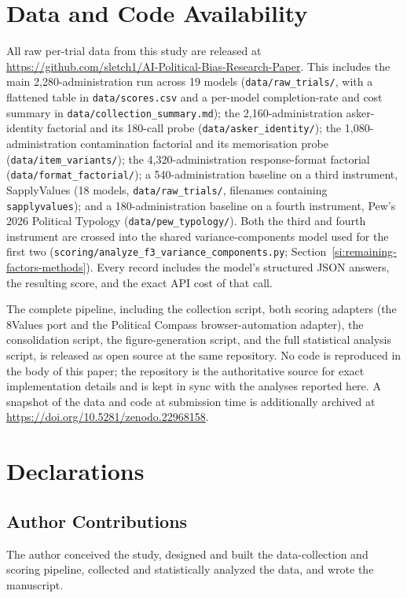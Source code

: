 \documentclass[11pt]{article}
\begin{document}
\section{Data and Code Availability}
\label{si:availability}

All raw per-trial data from this study are released at
\url{https://github.com/sletch1/AI-Political-Bias-Research-Paper}. This
includes the main 2{,}280-administration
run across 19 models (\texttt{data/raw\_trials/}, with a flattened table in
\texttt{data/scores.csv} and a per-model completion-rate and cost summary in
\texttt{data/collection\_summary.md}); the 2{,}160-administration
asker-identity factorial and its 180-call probe (\texttt{data/asker\_identity/});
the 1{,}080-administration contamination factorial and its memorisation
probe (\texttt{data/item\_variants/}); the 4{,}320-administration
response-format factorial (\texttt{data/format\_factorial/}); a
540-administration baseline on a third instrument, SapplyValues (18
models, \texttt{data/raw\_trials/}, filenames containing
\texttt{sapplyvalues}); and a 180-administration baseline on a fourth
instrument, Pew's 2026 Political Typology (\texttt{data/pew\_typology/}).
Both the third and fourth instrument are crossed into the shared
variance-components model used for the first two
(\texttt{scoring/analyze\_f3\_variance\_components.py}; Section~\ref{si:remaining-factors-methods}).
Every record includes the model's structured JSON answers, the resulting
score, and the exact API cost of that call.

The complete pipeline, including the collection script, both scoring
adapters (the 8Values port and the Political Compass browser-automation
adapter), the consolidation script, the figure-generation script, and the
full statistical analysis script, is released as open source at the same
repository. No code is reproduced in the body of this paper; the repository
is the authoritative source for exact implementation details and is kept
in sync with the analyses reported here. A snapshot of the data and code at
submission time is additionally archived at
\url{https://doi.org/10.5281/zenodo.22968158}.

\section{Declarations}
\label{si:ethics}

\subsection*{Author Contributions}
The author conceived the study, designed and built the data-collection and
scoring pipeline, collected and statistically analyzed the data, and wrote
the manuscript.
\end{document}
